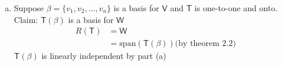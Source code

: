 \begin{enumerate}[(a)]
\begin{equation}
  +\cdots+\mathsf{T}(v_m)\right\}
\end{equation}
Suppose $\mathsf{T}(S)$ is linearly independent.
\\Claim: $S$ is linearly independent.
\\Suppose $x \in \text{span}(S)$ such that $x = c_1v_1 + c_2v_2
+\cdots+c_mv_m = 0,\; c_i \in F$
\begin{align}
\implies \mathsf{T}(x) &= \mathsf{T}(c_1v_1+c_2v_n +\cdots+c_mv_m)\\
&= \mathsf{T}(0)\\
&= 0\;\;\text{(by theorem 2.4)}
\end{align}
\begin{equation}
\mathsf{T}(x) =c_1\mathsf{T}(v_1) + c_2\mathsf{T}(v_2)
+\cdots+c_m\mathsf{T}(v_m) =0
\end{equation}
\begin{equation}
\mathsf{T}(v_i)\in\mathsf{T}(S)\; \forall i=1,2,\dots,m
\end{equation}
Therefore $\mathsf{T}(x) \in \text{span}(\mathsf{T}(S))$ 

\begin{equation}
\mathsf{T}(S)\;\;\text{is linearly independent} \implies c_1=c_2=\cdots=c_m=0
\end{equation}
\item Suppose $\beta =\{v_1,v_2,\dots,v_n\}$ is a basis for
  $\mathsf{V}$ and $\mathsf{T}$ is one-to-one and onto.
\\Claim: $\mathsf{T}(\beta)$ is a basis for $\mathsf{W}$
\begin{align}
R\left(\mathsf{T}\right) &=\mathsf{W}\\
&= \text{span}\left(\mathsf{T}(\beta)\right) \text{(by theorem 2.2)}
\end{align}
$\mathsf{T}(\beta)$ is linearly independent by part (a)
\end{enumerate}
